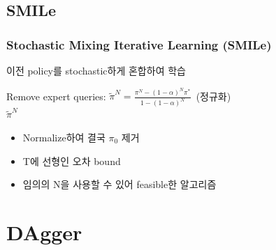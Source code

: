 \documentclass[11pt,xcolor={dvipsnames},hyperref={pdftex,pdfpagemode=UseNone,hidelinks,pdfdisplaydoctitle=true},usepdftitle=false]{beamer}
\begin{document}
\subsection*{SMILe}
\begin{frame}
\frametitle{Stochastic Mixing Iterative Learning (SMILe)}

이전 policy를 stochastic하게 혼합하여 학습

\vspace{3mm}

\begin{algorithm}[H]
    \SetAlgoLined
    Remove expert queries: $\tilde{\pi}^N = \frac{\pi^N - (1-\alpha)^N \pi^*}{1 - (1-\alpha)^N}$\ \quad (정규화) \\ 
    \Return $\tilde{\pi}^N$\ 
\end{algorithm}

\vspace{2mm}

\begin{itemize}
    \item Normalize하여 결국 $\pi_0$ 제거 
    \item T에 선형인 오차 bound
    \item 임의의 N을 사용할 수 있어 feasible한 알고리즘
\end{itemize}
\end{frame}

\section{DAgger}

\begin{frame}
\end{frame}
\end{document}
